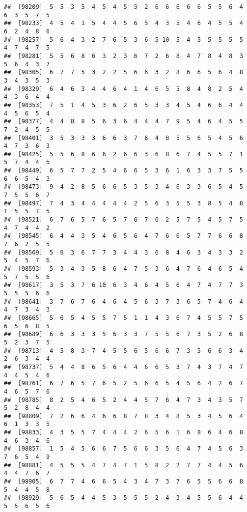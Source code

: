 \documentclass[
]{book}
\begin{document}
\begin{verbatim}
##  [98209]  5  5  3  5  4  5  4  5  5  2  6  6  6  6  6  5  5  6  4  6  3  5  7  5
##  [98233]  4  5  4  1  5  4  4  5  6  5  4  3  5  4  6  4  5  5  4  6  2  4  8  6
##  [98257]  5  6  4  3  2  7  6  5  3  6  5 10  5  4  5  5  5  5  5  4  7  4  7  5
##  [98281]  5  5  6  8  6  3  2  3  6  7  2  6  8  4  7  8  4  8  3  5  6  4  3  7
##  [98305]  6  7  7  5  3  2  2  5  6  6  3  2  8  6  6  5  6  4  8  3  4  3  5  3
##  [98329]  6  4  6  3  4  4  6  4  1  4  6  5  5  8  4  8  2  5  4  4  3  6  4  4
##  [98353]  7  5  1  4  5  3  6  2  6  5  3  3  4  5  4  6  6  4  4  4  5  6  5  4
##  [98377]  4  4  8  8  5  6  3  6  4  4  4  7  9  5  4  6  4  5  5  7  2  4  5  5
##  [98401]  3  5  3  3  3  6  6  3  7  6  4  8  5  5  6  5  4  5  6  4  7  3  6  3
##  [98425]  5  5  6  8  6  6  2  6  6  3  6  8  6  7  4  5  5  7  1  5  7  4  4  5
##  [98449]  6  5  7  7  2  5  4  6  6  5  3  6  1  6  3  3  7  5  5  6  6  5  4  3
##  [98473]  9  4  2  8  5  6  6  5  3  5  3  4  6  3  3  6  5  4  5  7  5  5  6  7
##  [98497]  7  4  3  4  4  4  4  4  2  5  6  3  5  5  3  8  5  4  8  1  5  5  7  5
##  [98521]  6  7  6  5  7  6  5  7  6  7  6  2  5  7  5  4  5  7  5  4  7  4  4  2
##  [98545]  6  4  4  3  5  4  6  5  6  4  7  6  6  5  7  7  6  6  8  7  6  2  5  5
##  [98569]  5  6  3  6  7  7  3  4  4  3  6  8  4  6  3  4  3  3  2  5  4  5  7  6
##  [98593]  5  3  4  3  5  8  6  4  7  5  3  6  4  7  6  4  6  5  4  5  7  5  5  6
##  [98617]  3  5  3  7  6 10  6  3  4  6  4  5  6  4  7  4  7  7  3  5  5  5  6  6
##  [98641]  3  7  6  7  6  4  6  4  5  6  3  7  3  6  5  7  4  6  4  4  7  3  4  3
##  [98665]  5  6  5  4  5  5  7  5  1  1  4  3  6  7  4  5  5  7  5  6  5  6  8  5
##  [98689]  6  6  3  3  3  5  6  3  3  7  5  5  6  7  3  5  2  6  8  5  2  3  7  5
##  [98713]  4  5  8  3  7  4  5  5  6  5  6  6  7  3  5  6  6  3  4  2  6  3  4  4
##  [98737]  5  4  4  8  6  5  6  4  4  6  6  5  3  7  4  3  7  4  7  4  4  5  4  6
##  [98761]  6  7  6  5  7  6  5  2  5  6  6  5  4  5  6  4  2  6  7  4  6  5  7  6
##  [98785]  8  2  5  4  6  5  2  4  4  5  7  6  4  7  3  4  3  5  7  5  2  8  4  4
##  [98809]  7  2  6  6  4  6  6  8  7  8  3  4  8  5  3  4  5  6  4  6  1  3  3  5
##  [98833]  4  3  5  5  7  4  4  4  2  6  5  6  1  6  8  6  4  6  8  4  6  3  4  6
##  [98857]  1  5  4  5  6  6  7  5  6  6  3  5  6  4  7  4  5  6  3  7  6  5  4  9
##  [98881]  4  5  5  5  4  7  4  7  1  5  8  2  2  7  7  4  4  5  6  4  4  7  6  7
##  [98905]  6  7  7  4  6  6  5  4  3  4  7  3  7  6  5  5  6  6  8  5  4  4  5  8
##  [98929]  5  6  5  4  4  5  3  5  5  5  2  4  3  4  5  5  6  4  4  5  5  6  5  6

\end{verbatim}
\end{document}
